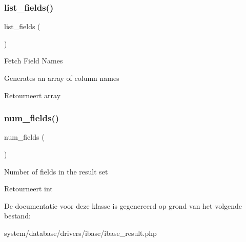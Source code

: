 \subsubsection{\texorpdfstring{list\_fields()}{list\_fields()}}
{\footnotesize\ttfamily list\+\_\+fields (\begin{DoxyParamCaption}{ }\end{DoxyParamCaption})}

Fetch Field Names

Generates an array of column names

\begin{DoxyReturn}{Retourneert}
array 
\end{DoxyReturn}
\mbox{\label{class_c_i___d_b__ibase__result_af831bf363e4d7d661a717a4932af449d}} 
\subsubsection{\texorpdfstring{num\_fields()}{num\_fields()}}
{\footnotesize\ttfamily num\+\_\+fields (\begin{DoxyParamCaption}{ }\end{DoxyParamCaption})}

Number of fields in the result set

\begin{DoxyReturn}{Retourneert}
int 
\end{DoxyReturn}


De documentatie voor deze klasse is gegenereerd op grond van het volgende bestand\+:\begin{DoxyCompactItemize}
\item 
system/database/drivers/ibase/ibase\+\_\+result.\+php\end{DoxyCompactItemize}

